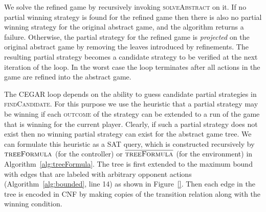 \documentclass{llncs}
\newcommand{\textoverline}[1]{$\overline{\mbox{#1}}$}
\begin{document}
We solve the refined game by recursively invoking \textsc{solveAbstract} on it.
If no partial winning strategy is found for the refined game then there is also
no partial winning strategy for the original abstract game, and the algorithm
returns a failure.  Otherwise, the partial strategy for the refined game is
\emph{projected} on the original abstract game by removing the leaves
introduced by refinements. The resulting partial strategy becomes a candidate
strategy to be verified at the next iteration of the loop. In the worst case
the loop terminates after all actions in the game are refined into the abstract
game.

The CEGAR loop depends on the ability to guess candidate partial strategies in
\textsc{findCandidate}. For this purpose we use the heuristic that a partial
strategy may be winning if each \textsc{outcome} of the strategy can be extended to a
run of the game that is winning for the current player.  Clearly, if such a partial 
strategy does not exist then no winning partial strategy can exist for the abstract 
game tree.  
We can formulate this heuristic as a SAT query, which is constructed
recursively by $\textsc{treeFormula}$ (for the controller) or $\textsc{\textoverline{treeFormula}}$
(for the environment) in Algorithm~\ref{alg:treeFormula}. The tree is first extended to the maximum
bound with edges that are labeled with arbitrary opponent actions (Algorithm~\ref{alg:bounded}, line 14) as shown in Figure~\ref{}.  
Then each edge in the tree is encoded in CNF by making copies of the transition relation along with the 
winning condition.


\end{document}
